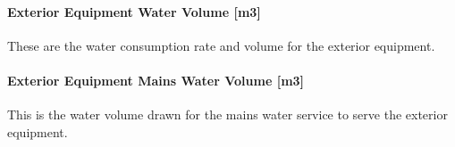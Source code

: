 \paragraph{Exterior Equipment Water Volume {[}m3{]}}\label{exterior-equipment-water-volume-m3}

These are the water consumption rate and volume for the exterior equipment.

\paragraph{Exterior Equipment Mains Water Volume {[}m3{]}}\label{exterior-equipment-mains-water-volume-m3}

This is the water volume drawn for the mains water service to serve the exterior equipment.

